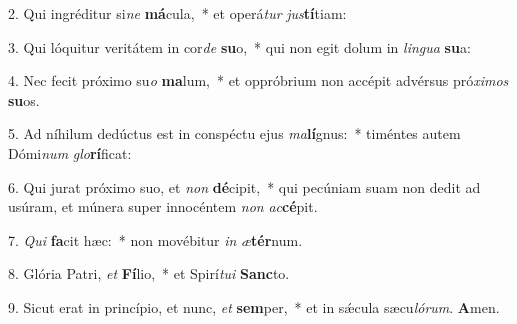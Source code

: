 2. Qui ingréditur si\textit{ne} \textbf{má}cula,~*  et operá\textit{tur} \textit{jus}\textbf{tí}tiam:\

3. Qui lóquitur veritátem in cor\textit{de} \textbf{su}o,~*  qui non egit dolum in \textit{lin}\textit{gua} \textbf{su}a:\

4. Nec fecit próximo su\textit{o} \textbf{ma}lum,~*  et oppróbrium non accépit advérsus pró\textit{xi}\textit{mos} \textbf{su}os.\

5. Ad níhilum dedúctus est in conspéctu ejus \textit{ma}\textbf{lí}gnus:~*  timéntes autem Dómi\textit{num} \textit{glo}\textbf{rí}ficat:\

6. Qui jurat próximo suo, et \textit{non} \textbf{dé}cipit,~*  qui pecúniam suam non dedit ad usúram, et múnera super innocéntem \textit{non} \textit{ac}\textbf{cé}pit.\

7. \textit{Qui} \textbf{fa}cit hæc:~*  non movébitur \textit{in} \textit{æ}\textbf{tér}num.\

8. Glória Patri, \textit{et} \textbf{Fí}lio,~*  et Spirí\textit{tu}\textit{i} \textbf{Sanc}to.\

9. Sicut erat in princípio, et nunc, \textit{et} \textbf{sem}per,~*  et in sǽcula sæcu\textit{ló}\textit{rum}. \textbf{A}men.\

